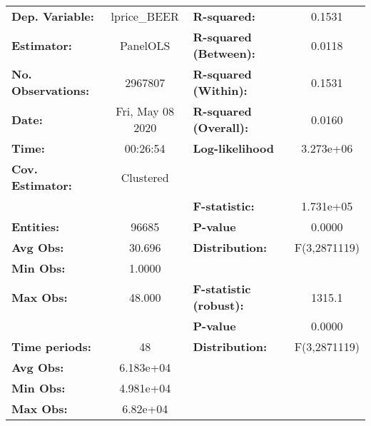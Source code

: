 \documentclass{report}
\begin{document}
\begin{center}
\begin{tabular}{lclc}
\toprule
\textbf{Dep. Variable:}       &    lprice\_BEER    & \textbf{  R-squared:         }   &      0.1531      \\
\textbf{Estimator:}           &      PanelOLS      & \textbf{  R-squared (Between):}  &      0.0118      \\
\textbf{No. Observations:}    &      2967807       & \textbf{  R-squared (Within):}   &      0.1531      \\
\textbf{Date:}                &  Fri, May 08 2020  & \textbf{  R-squared (Overall):}  &      0.0160      \\
\textbf{Time:}                &      00:26:54      & \textbf{  Log-likelihood     }   &    3.273e+06     \\
\textbf{Cov. Estimator:}      &     Clustered      & \textbf{                     }   &                  \\
\textbf{}                     &                    & \textbf{  F-statistic:       }   &    1.731e+05     \\
\textbf{Entities:}            &       96685        & \textbf{  P-value            }   &      0.0000      \\
\textbf{Avg Obs:}             &       30.696       & \textbf{  Distribution:      }   &   F(3,2871119)   \\
\textbf{Min Obs:}             &       1.0000       & \textbf{                     }   &                  \\
\textbf{Max Obs:}             &       48.000       & \textbf{  F-statistic (robust):} &      1315.1      \\
\textbf{}                     &                    & \textbf{  P-value            }   &      0.0000      \\
\textbf{Time periods:}        &         48         & \textbf{  Distribution:      }   &   F(3,2871119)   \\
\textbf{Avg Obs:}             &     6.183e+04      & \textbf{                     }   &                  \\
\textbf{Min Obs:}             &     4.981e+04      & \textbf{                     }   &                  \\
\textbf{Max Obs:}             &      6.82e+04      & \textbf{                     }   &                  \\
\bottomrule
\end{tabular}
\begin{tabular}{lcccccc}

\end{tabular}
\end{center}
\end{document}
